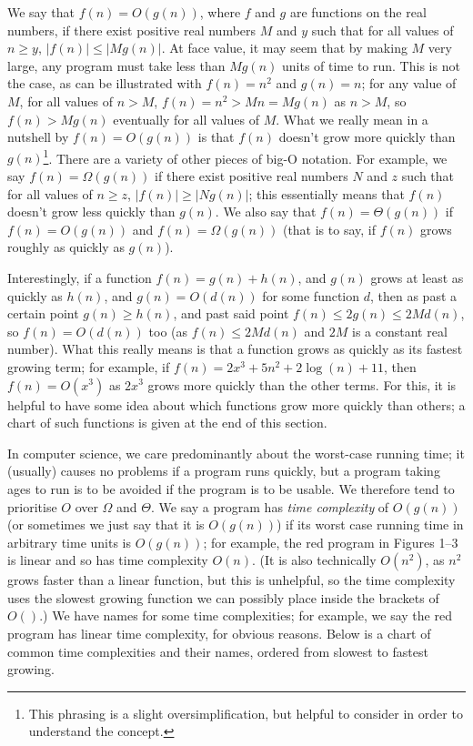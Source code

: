 \documentclass{article}
\begin{document}
We say that \(f(n)=O(g(n))\), where \(f\) and \(g\) are functions on the real numbers, if there exist positive real numbers \(M\) and \(y\) such that for all values of \(n \geq{} y\), \(|f(n)|\leq{}|Mg(n)|\). At face value, it may seem that by making \(M\) very large, any program must take less than \(Mg(n)\) units of time to run. This is not the case, as can be illustrated with \(f(n)=n^2\) and \(g(n)=n\); for any value of \(M\), for all values of \(n>M\), \(f(n)=n^2>Mn=Mg(n)\) as \(n>M\), so \(f(n)>Mg(n)\) eventually for all values of \(M\). What we really mean in a nutshell by \(f(n)=O(g(n))\) is that \(f(n)\) doesn't grow more quickly than \(g(n)\)\footnote{This phrasing is a slight oversimplification, but helpful to consider in order to understand the concept.}. There are a variety of other pieces of big-O notation. For example, we say \(f(n)=\Omega(g(n))\) if there exist positive real numbers \(N\) and \(z\) such that for all values of \(n \geq{} z\), \(|f(n)|\geq{}|Ng(n)|\); this essentially means that \(f(n)\) doesn't grow less quickly than \(g(n)\)\footnotemark[\value{footnote}]. We also say that \(f(n)=\Theta(g(n))\) if \(f(n)=O(g(n))\) and \(f(n)=\Omega(g(n))\) (that is to say, if \(f(n)\) grows roughly as quickly as \(g(n)\)\footnotemark[\value{footnote}]).

Interestingly, if a function \(f(n)=g(n)+h(n)\), and \(g(n)\) grows at least as quickly as \(h(n)\), and \(g(n)=O(d(n))\) for some function \(d\), then as past a certain point \(g(n)\geq{}h(n)\), and past said point \(f(n)\leq{}2g(n)\leq2Md(n)\), so \(f(n)=O(d(n))\) too (as \(f(n)\leq{}2Md(n)\) and \(2M\) is a constant real number). What this really means is that a function grows as quickly as its fastest growing term; for example, if \(f(n)=2x^3 + 5n^2 + 2\log(n) + 11\), then \(f(n)=O(x^3)\) as \(2x^3\) grows more quickly than the other terms. For this, it is helpful to have some idea about which functions grow more quickly than others; a chart of such functions is given at the end of this section.

In computer science, we care predominantly about the worst-case running time; it (usually) causes no problems if a program runs quickly, but a program taking ages to run is to be avoided if the program is to be usable. We therefore tend to prioritise \(O\) over \(\Omega\) and \(\Theta\). We say a program has \textit{time complexity} of \(O(g(n))\) (or sometimes we just say that it is \(O(g(n))\)) if its worst case running time in arbitrary time units is \(O(g(n))\); for example, the red program in Figures 1--3 is linear and so has time complexity \(O(n)\). (It is also technically \(O(n^2)\), as \(n^2\) grows faster than a linear function, but this is unhelpful, so the time complexity uses the slowest growing function we can possibly place inside the brackets of \(O()\).) We have names for some time complexities; for example, we say the red program has linear time complexity, for obvious reasons. Below is a chart of common time complexities and their names, ordered from slowest to fastest growing.
\end{document}
